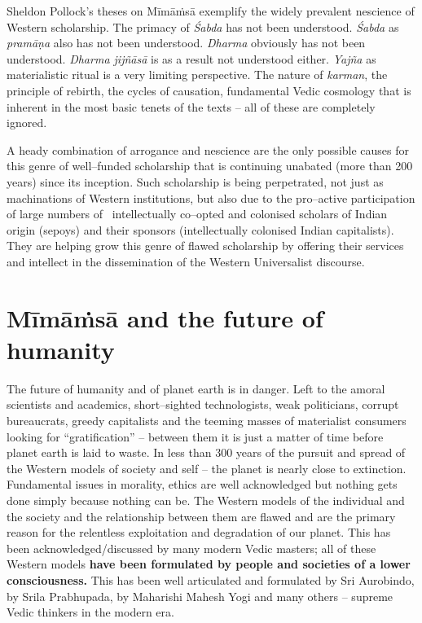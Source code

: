 Sheldon Pollock’s theses on Mīmāṁsā exemplify the widely prevalent nescience of Western scholarship. The primacy of \textit{Śabda} has not been understood. \textit{Śabda} as \textit{pramāṇa} also has not been understood. \textit{Dharma} obviously has not been understood. \textit{Dharma jijñāsā} is as a result not understood either. \textit{Yajña} as materialistic ritual is a very limiting perspective. The nature of \textit{karman}, the principle of rebirth, the cycles of causation, fundamental Vedic cosmology that is inherent in the most basic tenets of the texts – all of these are completely ignored.

A heady combination of arrogance and nescience are the only possible causes for this genre of well–funded scholarship that is continuing unabated (more than 200 years) since its inception. Such scholarship is being perpetrated, not just as machinations of Western institutions, but also due to the pro–active participation of large numbers of  intellectually co–opted and colonised scholars of Indian origin (sepoys) and their sponsors (intellectually colonised Indian capitalists). They are helping grow this genre of flawed scholarship by offering their services and intellect in the dissemination of the Western Universalist discourse. 

\newpage


\section*{Mīmāṁsā and the future of humanity}

\vskip -6pt

The future of humanity and of planet earth is in danger. Left to the amoral scientists and academics, short–sighted technologists, weak politicians, corrupt bureaucrats, greedy capitalists and the teeming masses of materialist consumers looking for “gratification” – between them it is just a matter of time before planet earth is laid to waste. In less than 300 years of the pursuit and spread of the Western models of society and self – the planet is nearly close to extinction. Fundamental issues in morality, ethics are well acknowledged but nothing gets done simply because nothing can be. The Western models of the individual and the society and the relationship between them are flawed and are the primary reason for the relentless exploitation and degradation of our planet. This has been acknowledged/discussed by many modern Vedic masters; all of these Western models \textbf{have been formulated by people and societies of a lower consciousness.} This has been well articulated and formulated by Sri Aurobindo, by Srila Prabhupada, by Maharishi Mahesh Yogi and many others – supreme Vedic thinkers in the modern era.

